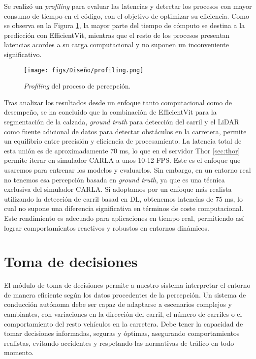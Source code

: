 Se realizó un \textit{profiling} para evaluar las latencias y detectar los procesos con mayor consumo de tiempo en el código, con el objetivo de optimizar su eficiencia. Como se observa en la Figura \ref{fig:profiling}, la mayor parte del tiempo de cómputo se destina a la predicción con EfficientVit, mientras que el resto de los procesos presentan latencias acordes a su carga computacional y no suponen un inconveniente significativo.
\begin{figure}[ht]
  \centering
  \texttt{[image: figs/Diseño/profiling.png]}
  \caption{\textit{Profiling} del proceso de percepción.}
  \label{fig:profiling}
\end{figure}

Tras analizar los resultados desde un enfoque tanto computacional como de desempeño, se ha concluido que la combinación de EfficientVit para la segmentación de la calzada, \textit{ground truth} para detección del carril y el \ac{LiDAR} como fuente adicional de datos para detectar obstáculos en la carretera, permite un equilibrio entre precisión y eficiencia de procesamiento. La latencia total de esta unión es de aproximadamente 70 ms, lo que en el servidor Thor \ref{sec:thor} permite iterar en simulador CARLA a unos 10-12 \ac{FPS}. Este es el enfoque que usaremos para entrenar los modelos y evaluarlos. Sin embargo, en un entorno real no tenemos esa percepción basada en \textit{ground truth}, ya que es una técnica exclusiva del simulador CARLA. Si adoptamos por un enfoque más realista utilizando la detección de carril basad en \ac{DL}, obtenemos latencias de 75 ms, lo cual no supone una diferencia significativa en términos de coste computacional. Este rendimiento es adecuado para aplicaciones en tiempo real, permitiendo así lograr comportamientos reactivos y robustos en entornos dinámicos.

\section{Toma de decisiones}

El módulo de toma de decisiones permite a nuestro sistema interpretar el entorno de manera eficiente según los datos procedentes de la percepción. Un sistema de conducción autónoma debe ser capaz de adaptarse a escenarios complejos y cambiantes, con variaciones en la dirección del carril, el número de carriles o el comportamiento del resto vehículos en la carretera. Debe tener la capacidad de tomar decisiones informadas, seguras y óptimas, asegurando comportamientos realistas, evitando accidentes y respetando las normativas de tráfico en todo momento.

